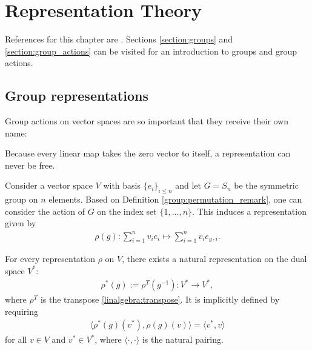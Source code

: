 \chapter{Representation Theory}

    References for this chapter are \cite{fultonharris, jeevanjee}. Sections \ref{section:groups} and \ref{section:group_actions} can be visited for an introduction to groups and group actions.

\section{Group representations}

    Group actions on vector spaces are so important that they receive their own name:
    \begin{property}[Freeness]
        Because every linear map takes the zero vector to itself, a representation can never be free.
    \end{property}


    \begin{example}\label{rep:permutation}
        Consider a vector space $V$ with basis $\{e_i\}_{i\leq n}$ and let $G=S_n$ be the symmetric group on $n$ elements. Based on Definition \ref{group:permutation_remark}, one can consider the action of $G$ on the index set $\{1,\ldots,n\}$. This induces a representation given by
        \begin{gather}
            \rho(g):\sum_{i=1}^nv_ie_i\mapsto\sum_{i=1}^nv_ie_{g\cdot i}.
        \end{gather}
    \end{example}

    \begin{example}
        For every representation $\rho$ on $V$, there exists a natural representation on the dual space $V^*$:
        \begin{gather}
            \rho^*(g) := \rho^T(g^{-1}):V^*\rightarrow V^*,
        \end{gather}
        where $\rho^T$ is the transpose \ref{linalgebra:transpose}. It is implicitly defined by requiring
        \begin{gather}
            \Big\langle\rho^*(g)(v^*),\rho(g)(v)\Big\rangle = \langle v^*,v \rangle
        \end{gather}
        for all $v\in V$ and $v^*\in V^*$, where $\langle\cdot,\cdot\rangle$ is the natural pairing.
    \end{example}

